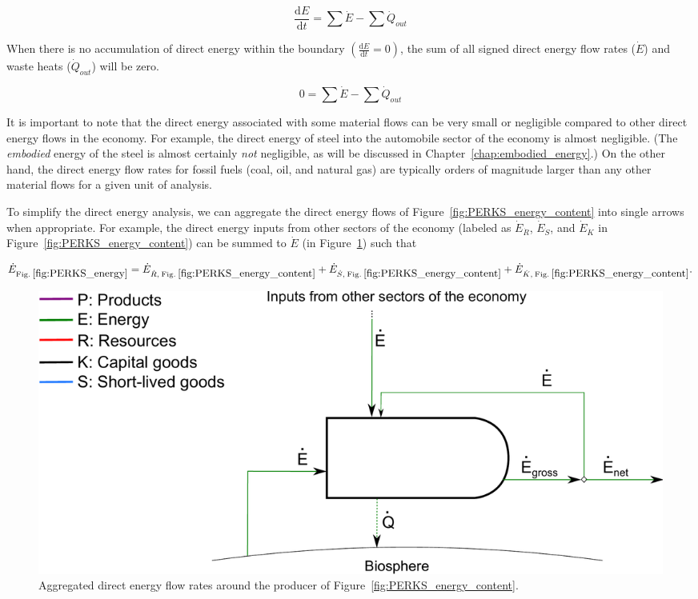 \begin{equation} \label{eq:First_Law_with_accumulation}
	\frac{\mathrm{d}E}{\mathrm{d}t} = \sum \dot{E} - \sum \dot{Q}_{out}
\end{equation}

When there is no accumulation of direct energy within the boundary
$\left( \frac{\mathrm{d}E}{\mathrm{d}t} = 0 \right)$, the sum of all 
signed direct energy flow rates ($\dot{E}$) 
and waste heats ($\dot{Q}_{out}$) will be zero.

\begin{equation} \label{eq:First_Law_no_accumulation}
	0 = \sum \dot{E} - \sum \dot{Q}_{out}
\end{equation}

It is important to note that the direct energy associated with some material flows can
be very small or negligible compared to other direct energy flows in the economy.
For example, the direct energy of steel into the automobile sector of the economy 
is almost negligible. (The \emph{embodied} energy of the steel is almost certainly
\emph{not} negligible, as will be discussed in Chapter~\ref{chap:embodied_energy}.)
On the other hand, the direct energy flow rates for fossil fuels (coal, oil, and natural gas)
are typically orders of magnitude larger than any other 
material flows for a given unit of analysis.

To simplify the direct energy analysis, 
we can aggregate the direct energy flows of Figure~\ref{fig:PERKS_energy_content}
into single arrows when appropriate. 
For example, the direct energy inputs from other sectors of the economy
(labeled as $\dot{E}_{\dot{R}}$, $\dot{E}_{\dot{S}}$, and $\dot{E}_{\dot{K}}$ 
in Figure~\ref{fig:PERKS_energy_content}) can be summed to $\dot{E}$ 
(in Figure~\ref{fig:PERKS_energy}) such that

\begin{equation} \label{eq:direct_energy_aggregation}
	\dot{E}_{\mathrm{Fig. \: \ref{fig:PERKS_energy}}} 
	= \dot{E}_{\dot{R}, \: \mathrm{Fig. \: \ref{fig:PERKS_energy_content}}} 
	+ \dot{E}_{\dot{S}, \: \mathrm{Fig. \: \ref{fig:PERKS_energy_content}}} 
	+ \dot{E}_{\dot{K}, \: \mathrm{Fig. \: \ref{fig:PERKS_energy_content}}}.
\end{equation}

\begin{figure}[h!]
\centering
\includegraphics[width=0.8\linewidth]{Part_2/Chapter_Energy/images/PERKS_basic_unit_energy.pdf}
\caption{Aggregated direct energy flow rates around 
the producer of Figure~\ref{fig:PERKS_energy_content}.}
\label{fig:PERKS_energy}
\end{figure}


